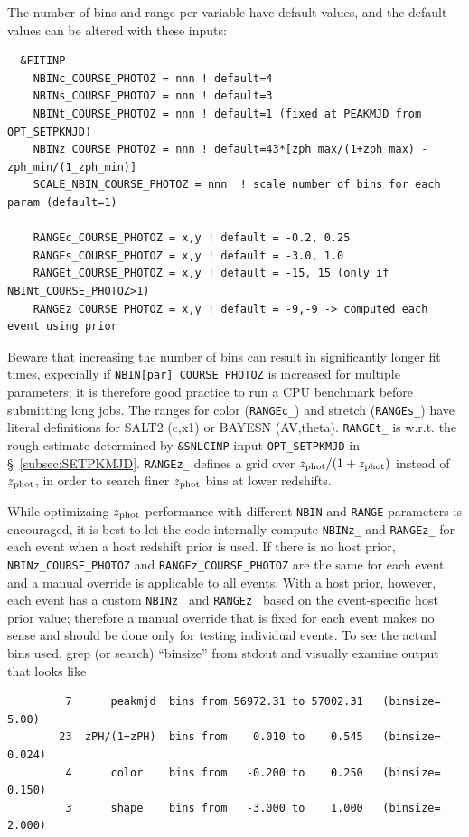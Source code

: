 \documentclass[12pt]{article}
\newcommand{\Zphot}{z_{\rm phot}}
\begin{document}
The number of bins and range per variable have default values,
and the default values can be altered with these inputs:
\begin{verbatim}
  &FITINP
    NBINc_COURSE_PHOTOZ = nnn ! default=4  
    NBINs_COURSE_PHOTOZ = nnn ! default=3  
    NBINt_COURSE_PHOTOZ = nnn ! default=1 (fixed at PEAKMJD from OPT_SETPKMJD)
    NBINz_COURSE_PHOTOZ = nnn ! default=43*[zph_max/(1+zph_max) - zph_min/(1_zph_min)]
    SCALE_NBIN_COURSE_PHOTOZ = nnn  ! scale number of bins for each param (default=1)

    RANGEc_COURSE_PHOTOZ = x,y ! default = -0.2, 0.25
    RANGEs_COURSE_PHOTOZ = x,y ! default = -3.0, 1.0
    RANGEt_COURSE_PHOTOZ = x,y ! default = -15, 15 (only if NBINt_COURSE_PHOTOZ>1)
    RANGEz_COURSE_PHOTOZ = x,y ! default = -9,-9 -> computed each event using prior
\end{verbatim}
Beware that increasing the number of bins can result in significantly longer fit times, 
expecially if \verb|NBIN[par]_COURSE_PHOTOZ|
is increased for multiple parameters;
it is therefore good practice to run a CPU benchmark before submitting long jobs.
The ranges for color (\verb|RANGEc_|) and stretch (\verb|RANGEs_|) have literal definitions
for SALT2 (c,x1) or BAYESN (AV,theta). 
\verb|RANGEt_| is w.r.t. the rough estimate determined by {\tt \&SNLCINP} input 
\verb|OPT_SETPKMJD| in \S~\ref{subsec:SETPKMJD}.
\verb|RANGEz_| defines a grid over $\Zphot/(1+\Zphot)$ instead of $\Zphot$, in order to 
search finer $\Zphot$ bins at lower redshifts.

While optimizaing $\Zphot$ performance with different {\tt NBIN} and {\tt RANGE} parameters 
is encouraged,
it is best to let the code internally compute {\tt NBINz\_} and {\tt RANGEz\_} for each event
when a host redshift prior is used.
If there is no host prior, \verb|NBINz_COURSE_PHOTOZ| and \verb|RANGEz_COURSE_PHOTOZ|
are the same for each event and a manual override is applicable to all events.
With a host prior, however, each event has a custom \verb|NBINz_| and \verb|RANGEz_|
based on the event-specific host prior value;
therefore a manual override that is fixed for each event makes no sense and
should be done only for testing individual events.
To see the actual bins used, grep (or search) ``binsize'' from stdout and 
visually examine output that looks like
%
\begin{verbatim}
         7      peakmjd  bins from 56972.31 to 57002.31   (binsize=   5.00)
        23  zPH/(1+zPH)  bins from    0.010 to    0.545   (binsize=  0.024)
         4      color    bins from   -0.200 to    0.250   (binsize=  0.150)
         3      shape    bins from   -3.000 to    1.000   (binsize=  2.000) 
\end{verbatim}
\end{document}
